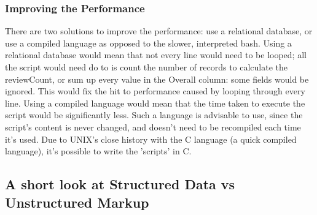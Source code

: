 \documentclass{article}
\begin{document}
	\subsubsection{Improving the Performance} \label{Efficiency Solution}
	There are two solutions to improve the performance: use a relational database, or use a compiled language as opposed to the slower, interpreted bash. 
	\newline
	Using a relational database would mean that not every line would need to be looped; all the script would need do to is count the number of records to calculate the reviewCount, or sum up every value in the Overall column: some fields would be ignored. 
	This would fix the hit to performance caused by looping through every line.
	\newline
	Using a compiled language would mean that the time taken to execute the script would be significantly less. Such a language is advisable to use, since the script's content is never changed, and doesn't need to be recompiled each time it's used. Due to UNIX's close history with the C language (a quick compiled language), it's possible to write the 'scripts' in C. 
	
	\subsection{A short look at Structured Data vs Unstructured Markup} \label{Data Structure Discussion}
\end{document}

